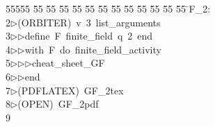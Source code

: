 %
%
\begin{tabbing}
55555 \= 55 \= 55 \= 55 \= 55 \= 55 \= 55 \= 55 \= 55 \= 55 \= 55 \= 55 \= 55 \= \>F\_2:\\[0pt]
2\>$\triangleright$\>(ORBITER)\ v\ 3\ list\_arguments\ \\[0pt]
3\>$\triangleright$\>$\triangleright$\>define\ F\ finite\_field\ q\ 2\ end\ \\[0pt]
4\>$\triangleright$\>$\triangleright$\>with\ F\ do\ finite\_field\_activity\ \\[0pt]
5\>$\triangleright$\>$\triangleright$\>$\triangleright$\>cheat\_sheet\_GF\ \\[0pt]
6\>$\triangleright$\>$\triangleright$\>end\\[0pt]
7\>$\triangleright$\>(PDFLATEX)\ GF\_2tex\\[0pt]
8\>$\triangleright$\>(OPEN)\ GF\_2pdf\\[0pt]
9\>\end{tabbing}
